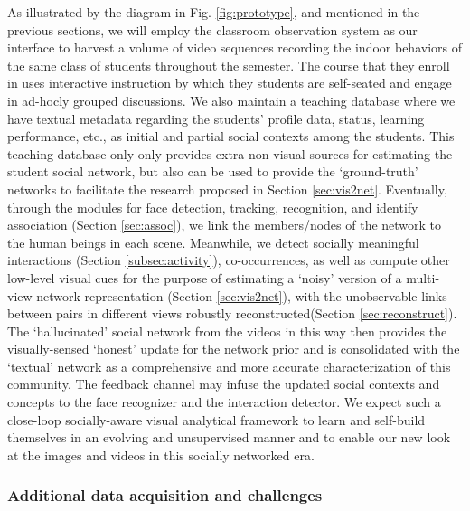 As illustrated by the diagram in Fig. \ref{fig:prototype}, and mentioned in the previous sections, we will employ the classroom observation system as our interface to harvest a volume of video sequences recording the indoor behaviors of the same class of students throughout the semester. The course that they enroll in uses interactive instruction by which they students are self-seated and engage in ad-hocly grouped discussions. We also maintain a teaching database where we have textual metadata regarding the students' profile data, status, learning performance, etc., as initial and partial social contexts among the students. This teaching database only only provides extra non-visual sources for estimating the student social network, but also can be used to provide the `ground-truth' networks to facilitate the research proposed in Section \ref{sec:vis2net}. Eventually, through the modules for face detection, tracking, recognition, and identify association (Section \ref{sec:assoc}), we link the members/nodes of the network to the human beings in each scene. Meanwhile, we detect socially meaningful interactions (Section \ref{subsec:activity}), co-occurrences, as well as compute other low-level visual cues for the purpose of estimating a `noisy' version of a multi-view network representation (Section \ref{sec:vis2net}), with the unobservable links between pairs in different views robustly reconstructed(Section \ref{sec:reconstruct}). The `hallucinated' social network from the videos in this way then provides the visually-sensed `honest' update for the network prior and is consolidated with the `textual' network as a comprehensive and more accurate characterization of this community. The feedback channel may infuse the updated social contexts and concepts to the face recognizer and the interaction detector. We expect such a close-loop socially-aware visual analytical framework to learn and self-build themselves in an evolving and unsupervised manner and to enable our new look at the images and videos in this socially networked era.


\subsubsection{Additional data acquisition and challenges}

